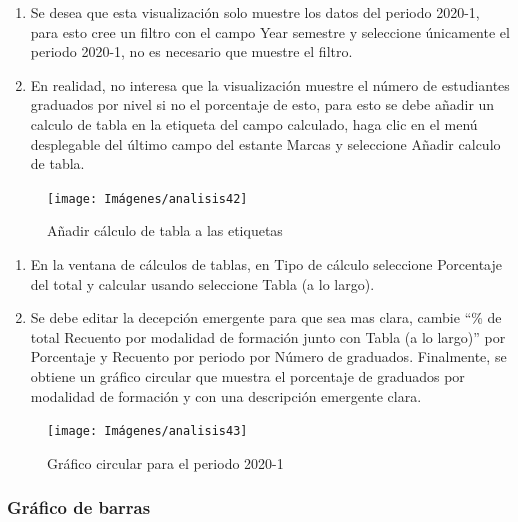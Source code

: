 \documentclass[
]{book}
\begin{document}
\begin{enumerate}
\def\labelenumi{\arabic{enumi}.}
\setcounter{enumi}{8}
\item
  Se desea que esta visualización solo muestre los datos del periodo 2020-1, para esto cree un filtro con el campo Year semestre y seleccione únicamente el periodo 2020-1, no es necesario que muestre el filtro.
\item
  En realidad, no interesa que la visualización muestre el número de estudiantes graduados por nivel si no el porcentaje de esto, para esto se debe añadir un calculo de tabla en la etiqueta del campo calculado, haga clic en el menú desplegable del último campo del estante Marcas y seleccione Añadir calculo de tabla.
\end{enumerate}

\begin{figure}

{\centering \texttt{[image: Imágenes/analisis42]} 

}

\caption{Añadir cálculo de tabla a las etiquetas}\label{fig:paso10graficocircular-fig}
\end{figure}

\begin{enumerate}
\def\labelenumi{\arabic{enumi}.}
\setcounter{enumi}{10}
\item
  En la ventana de cálculos de tablas, en Tipo de cálculo seleccione Porcentaje del total y calcular usando seleccione Tabla (a lo largo).
\item
  Se debe editar la decepción emergente para que sea mas clara, cambie ``\% de total Recuento por modalidad de formación junto con Tabla (a lo largo)'' por Porcentaje y Recuento por periodo por Número de graduados. Finalmente, se obtiene un gráfico circular que muestra el porcentaje de graduados por modalidad de formación y con una descripción emergente clara.
\end{enumerate}

\begin{figure}

{\centering \texttt{[image: Imágenes/analisis43]} 

}

\caption{Gráfico circular para el periodo 2020-1}\label{fig:graficocircularfinal-fig}
\end{figure}

\hypertarget{graficodebarras}{%
\subsubsection{Gráfico de barras}\label{graficodebarras}}
\end{document}
